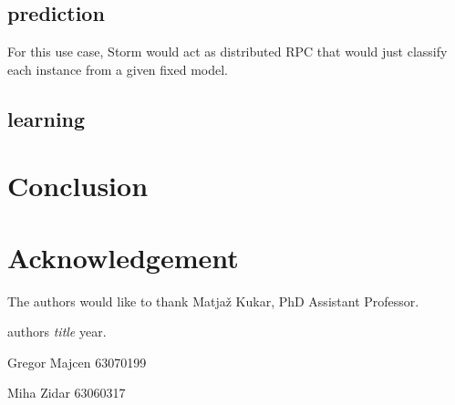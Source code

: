\documentclass[journal]{IEEEtran/IEEEtran}
\begin{document}
\subsection{prediction}
For this use case, Storm would act as distributed RPC that would just classify each instance from a given fixed model. 

\subsection{learning}

\section{Conclusion}

\newpage
\appendices

\section*{Acknowledgement}
The authors would like to thank Matjaž Kukar, PhD Assistant Professor.


\begin{thebibliography}{1}
 authors \emph{title} \relax year.

\end{thebibliography}

\newpage

\begin{IEEEbiography}{Gregor Majcen}
63070199
\end{IEEEbiography}

\begin{IEEEbiography}{Miha Zidar}
63060317
\end{IEEEbiography}
\end{document}
